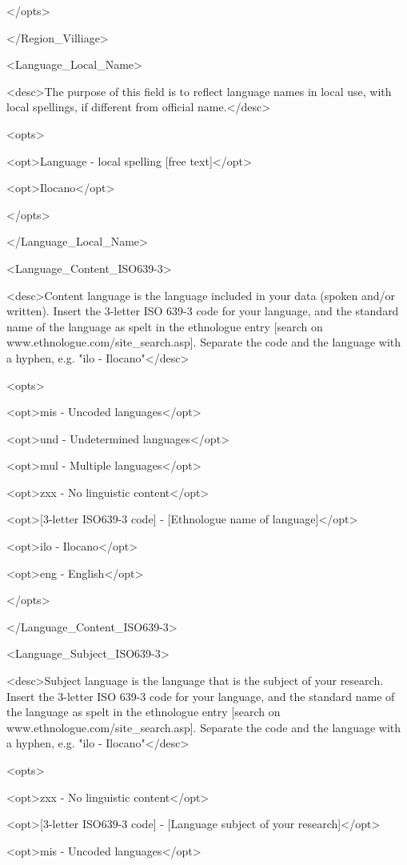 </opts>

</Region_Villiage>

<Language_Local_Name>

<desc>The purpose of this field is to reflect language names in local use, with local spellings, if different from official name.</desc>

<opts>

<opt>Language - local spelling {[}free text{]}</opt>

<opt>Ilocano</opt>

</opts>

</Language_Local_Name>

<Language_Content_ISO639-3>

<desc>Content language is the language included in your data (spoken and/or written). Insert the 3-letter ISO 639-3 code for your language, and the standard name of the language as spelt in the ethnologue entry {[}search on www.ethnologue.com/site_search.asp{]}. Separate the code and the language with a hyphen, e.g. "ilo - Ilocano"</desc>

<opts>

<opt>mis - Uncoded languages</opt>

<opt>und - Undetermined languages</opt>

<opt>mul - Multiple languages</opt>

<opt>zxx - No linguistic content</opt>

<opt>{[}3-letter ISO639-3 code{]} - {[}Ethnologue name of language{]}</opt>

<opt>ilo - Ilocano</opt>

<opt>eng - English</opt>

</opts>

</Language_Content_ISO639-3>

<Language_Subject_ISO639-3>

<desc>Subject language is the language that is the subject of your research. Insert the 3-letter ISO 639-3 code for your language, and the standard name of the language as spelt in the ethnologue entry {[}search on www.ethnologue.com/site_search.asp{]}. Separate the code and the language with a hyphen, e.g. "ilo - Ilocano"</desc>

<opts>

<opt>zxx - No linguistic content</opt>

<opt>{[}3-letter ISO639-3 code{]} - {[}Language subject of your research{]}</opt>

<opt>mis - Uncoded languages</opt>

